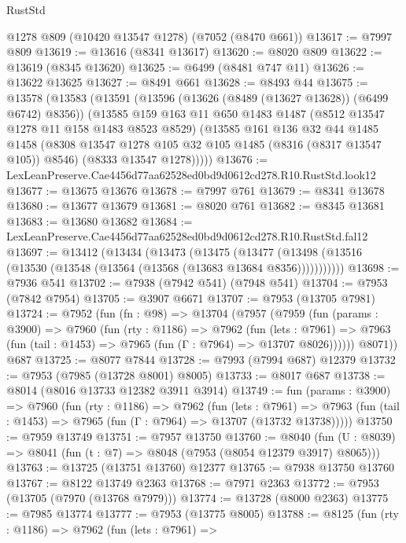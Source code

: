 \begin{lexlean}{RustStd}
\begin{coremodule}
    @1278
    @809
    (@10420 @13547 @1278)
    (@7052 (@8470 @661))
@13617 := @7997 @809
@13619 := @13616 (@8341 @13617)
@13620 := @8020 @809
@13622 := @13619 (@8345 @13620)
@13625 := @6499 (@8481 @747 @11)
@13626 := @13622 @13625
@13627 := @8491 @661
@13628 := @8493 @44
@13675 := @13578
    (@13583
      (@13591
        (@13596 (@13626 (@8489 (@13627 @13628)) (@6499 @6742) @8356))
        (@13585
          @159
          @163
          @11
          @650
          @1483
          @1487
          (@8512 @13547 @1278 @11 @158 @1483 @8523 @8529)
          (@13585
            @161
            @136
            @32
            @44
            @1485
            @1458
            (@8308 @13547 @1278 @105 @32 @105 @1485 (@8316 (@8317 @13547 @105)) @8546)
            (@8333 @13547 @1278)))))
@13676 := LexLeanPreserve.Cae4456d77aa62528ed0bd9d0612cd278.R10.RustStd.look12
@13677 := @13675 @13676
@13678 := @7997 @761
@13679 := @8341 @13678
@13680 := @13677 @13679
@13681 := @8020 @761
@13682 := @8345 @13681
@13683 := @13680 @13682
@13684 := LexLeanPreserve.Cae4456d77aa62528ed0bd9d0612cd278.R10.RustStd.fal12
@13697 := @13412
    (@13434
      (@13473
        (@13475
          (@13477 (@13498 (@13516 (@13530 (@13548 (@13564 (@13568 (@13683 @13684 @8356)))))))))))
@13698 := @7936 @541
@13702 := @7938 (@7942 @541) (@7948 @541)
@13704 := @7953 (@7842 @7954)
@13705 := @3907 @6671
@13707 := @7953 (@13705 @7981)
@13724 := @7952
    (fun (fn : @98) =>
    @13704
      (@7957
        (@7959
          (fun (params : @3900) =>
          @7960
            (fun (rty : @1186) =>
            @7962
              (fun (lets : @7961) =>
              @7963 (fun (tail : @1453) => @7965 (fun (Γ : @7964) => @13707 @8026))))))
        @8071))
    @687
@13725 := @8077 @7844
@13728 := @7993 (@7994 @687) @12379
@13732 := @7953 (@7985 (@13728 @8001) @8005)
@13733 := @8017 @687
@13738 := @8014 (@8016 @13733 @12382 @3911 @3914)
@13749 := fun (params : @3900) =>
  @7960
    (fun (rty : @1186) =>
    @7962
      (fun (lets : @7961) =>
      @7963 (fun (tail : @1453) => @7965 (fun (Γ : @7964) => @13707 (@13732 @13738)))))
@13750 := @7959 @13749
@13751 := @7957 @13750
@13760 := @8040
    (fun (U : @8039) => @8041 (fun (t : @7) => @8048 (@7953 (@8054 @12379 @3917) @8065)))
@13763 := @13725 (@13751 @13760) @12377
@13765 := @7938 @13750 @13760
@13767 := @8122 @13749 @2363
@13768 := @7971 @2363
@13772 := @7953 (@13705 (@7970 (@13768 @7979)))
@13774 := @13728 (@8000 @2363)
@13775 := @7985 @13774
@13777 := @7953 (@13775 @8005)
@13788 := @8125
    (fun (rty : @1186) =>
    @7962
      (fun (lets : @7961) =>

\end{coremodule}
\end{lexlean}
